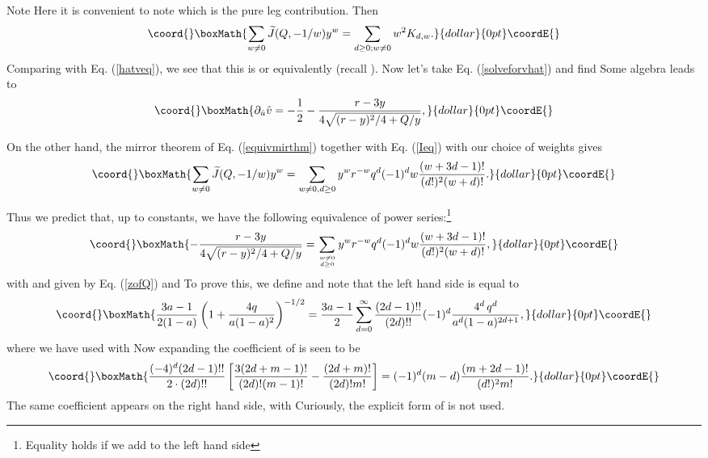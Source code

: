 \documentclass[a4paper,11pt]{article}
\begin{document}
Note
\coordHE{}
Here it is convenient to note \coordHE{}
which is the pure leg contribution.
Then
$$\coord{}\boxMath{\sum_{w\neq 0} \widetilde{J}(Q,-1/w)y^w =
\sum_{d \geq 0; w \neq 0} w^2 K_{d,w}.}{dollar}{0pt}\coordE{}$$
Comparing with Eq. \!(\ref{hatveq}), we see that this is
\coordHE{} or
equivalently \coordHE{}
(recall \coordHE{}).
Now let's take Eq. \!(\ref{solveforvhat}) and
find \coordHE{}
Some algebra leads to 
$$\coord{}\boxMath{\partial_{\hat{u}} \hat{v} =
-\frac{1}{2} - \frac{r-3y}{4\sqrt{(r-y)^2/4 + Q/y}},}{dollar}{0pt}\coordE{}$$

On the other hand, the mirror theorem of
Eq. \!(\ref{equivmirthm}) together with
Eq. \!(\ref{Ieq}) with our choice of weights
gives
$$\coord{}\boxMath{\sum_{w\neq 0} 
\widetilde{J}(Q,-1/w)y^w=
\sum_{w\neq 0,d\geq 0} y^w r^{-w} q^d (-1)^d w
\frac{(w+3d-1)!}{(d!)^2(w+d)!}.}{dollar}{0pt}\coordE{}$$

Thus we predict that, up to constants, we have the
following equivalence of power series:\footnote{Equality
holds if we add \coordHE{} to the left hand side}
$$\coord{}\boxMath{-\frac{r-3y}{4\sqrt{(r-y)^2/4 + Q/y}}=
\sum_{w\neq 0\atop d\geq 0}
y^w r^{-w} q^d (-1)^d w
\frac{(w+3d-1)!}{(d!)^2(w+d)!},
}{dollar}{0pt}\coordE{}$$
with \coordHE{} and \coordHE{} given by Eq. \!(\ref{zofQ})
and \coordHE{}
To prove this, we define \coordHE{} and note that the
left hand side is equal to
$$\coord{}\boxMath{\frac{3a-1}{2(1-a)}\left(1+\frac{4q}{a(1-a)^2}\right)^{-1/2}
= \frac{3a-1}{2}\sum_{d=0}^{\infty}\frac{(2d-1)!!}{(2d)!!}
(-1)^d\frac{4^d\,q^d}{a^d(1-a)^{2d+1}},}{dollar}{0pt}\coordE{}$$
where we have used \coordHE{} with \coordHE{}  Now expanding \coordHE{}
the coefficient of \coordHE{} is seen to be
$$\coord{}\boxMath{\frac{(-4)^d(2d-1)!!}{2\cdot (2d)!!}
\left[\frac{3(2d+m-1)!}{(2d)!(m-1)!}-
\frac{(2d+m)!}{(2d)!m!}\right]=
(-1)^d(m-d)\frac{(m+2d-1)!}{(d!)^2 m!}.}{dollar}{0pt}\coordE{}$$
The same coefficient appears on the right hand side,
with \coordHE{}
Curiously, the explicit form of \coordHE{} is not used.
\end{document}
